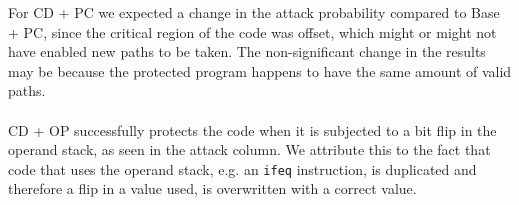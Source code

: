 For CD + PC we expected a change in the attack probability compared to Base + PC, since the critical region of the code was offset, which might or might not have enabled new paths to be taken. The non-significant change in the results may be because the protected program happens to have the same amount of valid paths.\\\\
CD + OP successfully protects the code when it is subjected to a bit flip in the operand stack, as seen in the attack column. We attribute this to the fact that code that uses the operand stack, e.g. an \texttt{ifeq} instruction, is duplicated and therefore a flip in a value used, is overwritten with a correct value.